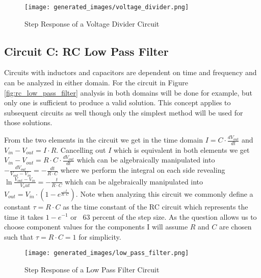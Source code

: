 \documentclass[main.tex]{subfiles}
\begin{document}
\begin{figure}[H]
    \centering
    \texttt{[image: generated\_images/voltage\_divider.png]}
    \caption{Step Response of a Voltage Divider Circuit}
    \label{fig:step-response-voltage-divider}
\end{figure}


\subsection{Circuit C: RC Low Pass Filter}
Circuits with inductors and capacitors are dependent on time and frequency and can be analyzed in either domain. For the circuit in Figure \ref{fig:rc_low_pass_filter} analysis in both domains will be done for example, but only one is sufficient to produce a valid solution. This concept applies to subsequent circuits as well though only the simplest method will be used for those solutions.

From the two elements in the circuit we get in the time domain $I = C \cdot \frac{dV_{out}}{dt}$ and $V_{in} - V_{out} = I \cdot R$. Cancelling out $I$ which is equivalent in both elements we get $V_{in} - V_{out} = R \cdot C \cdot \frac{dV_{out}}{dt}$ which can be algebraically manipulated into $-\frac{dV_{out}}{V_{out}-V_{in}} = -\frac{dt}{R \cdot C}$ where we perform the integral on each side revealing $\ln{\frac{V_{out}-V_{in}}{V_out}}=-\frac{t}{R \cdot C}$ which can be algebraically manipulated into $V_{out}=V_{in} \cdot (1-e^{\frac{-t}{R \cdot C}})$. Note when analyzing this circuit we commonly define a constant $\tau = R \cdot C$ as the time constant of the RC circuit which represents the time it takes $1-e^{-1}$ or ~63 percent of the step size. As the question allows us to choose component values for the components I will assume $R$ and $C$ are chosen such that $\tau = R \cdot C = 1$ for simplicity.

\begin{figure}[H]
    \centering
    \texttt{[image: generated\_images/low\_pass\_filter.png]}
    \caption{Step Response of a Low Pass Filter Circuit}
    \label{fig:step-response-low-pass-filter}
\end{figure}
\end{document}
